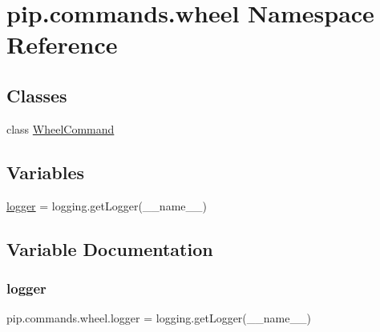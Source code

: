 \hypertarget{namespacepip_1_1commands_1_1wheel}{}\section{pip.\+commands.\+wheel Namespace Reference}
\label{namespacepip_1_1commands_1_1wheel}
\subsection*{Classes}
\begin{DoxyCompactItemize}
\item 
class \hyperlink{classpip_1_1commands_1_1wheel_1_1_wheel_command}{Wheel\+Command}
\end{DoxyCompactItemize}
\subsection*{Variables}
\begin{DoxyCompactItemize}
\item 
\hyperlink{namespacepip_1_1commands_1_1wheel_a5745ceba45a15fb39bfe31a4035d77d4}{logger} = logging.\+get\+Logger(\+\_\+\+\_\+name\+\_\+\+\_\+)
\end{DoxyCompactItemize}


\subsection{Variable Documentation}
\mbox{\label{namespacepip_1_1commands_1_1wheel_a5745ceba45a15fb39bfe31a4035d77d4}} 
\subsubsection{\texorpdfstring{logger}{logger}}
{\footnotesize\ttfamily pip.\+commands.\+wheel.\+logger = logging.\+get\+Logger(\+\_\+\+\_\+name\+\_\+\+\_\+)}

